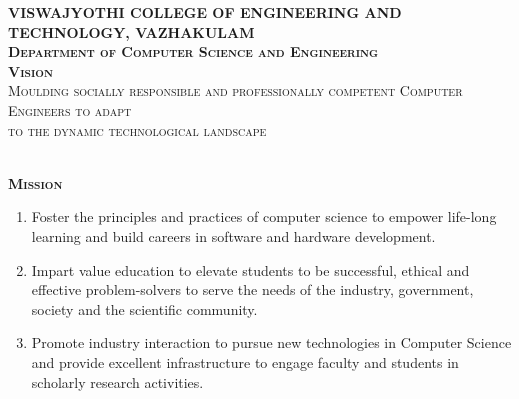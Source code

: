 \documentclass[10pt,a4paper]{report}
\begin{document}
	\begin{center}

	\textsc{\large\bfseries VISWAJYOTHI COLLEGE OF ENGINEERING AND}\\
	[0.15cm]
	\textsc{\large\bfseries TECHNOLOGY, VAZHAKULAM}\\
	[0.50cm]
	\textsc{\large\bfseries\upshape Department of Computer Science and Engineering}\\	
	[1cm]
	\textsc{\large\bfseries\upshape Vision}\\
	[0.50cm]
	\textsc{\large\mdseries\upshape Moulding socially responsible and professionally competent Computer Engineers to adapt}\\
	[0.10cm]
	\textsc{\large\mdseries\upshape to the dynamic technological landscape}\\
	
	\begin{center}
		
		\textsc{\large\bfseries }\\
		[0.50cm]
		\textsc{\large\bfseries\upshape Mission}\\
		[0.50cm]
		\justify
		\begin{enumerate}
			\item\large Foster the principles and practices of computer science to empower life-long
			learning and build careers in software and hardware development.
			\item\large Impart value education to elevate students to be successful, ethical and
			effective problem-solvers to serve the needs of the industry, government, society
			and the scientific community.
			\item\large Promote industry interaction to pursue new technologies in Computer Science and
			provide excellent infrastructure to engage faculty and students in scholarly
			research activities.

		\end{enumerate}

	\end{center}

	\begin{center}


\end{center}
\end{center}
\end{document}
